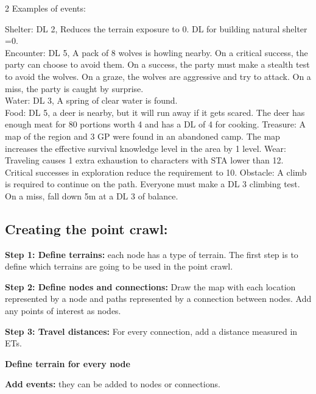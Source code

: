 \begin{multicols}{2}
Examples of events:

Shelter: DL 2, Reduces the terrain exposure to 0. DL for building natural shelter =0. \\
Encounter: DL 5, A pack of 8 wolves is howling nearby. On a critical success, the party can choose to avoid them. On a success, the party must make a stealth test to avoid the wolves. On a graze, the wolves are aggressive and try to attack. On a miss, the party is caught by surprise.\\
Water: DL 3, A spring of clear water is found. \\
Food: DL 5, a deer is nearby, but it will run away if it gets scared. The deer has enough meat for 80 portions worth 4 and has a DL of 4 for cooking.  
Treasure: A map of the region and 3 GP were found in an abandoned camp. The map increases the effective survival knowledge level in the area by 1 level.
Wear: Traveling causes 1 extra exhaustion to characters with STA lower than 12. Critical successes in exploration reduce the requirement to 10.
Obstacle: A climb is required to continue on the path. Everyone must make a DL 3 climbing test. On a miss, fall down 5m at a DL 3 of balance.

\subsection{Creating the point crawl:}

\textbf{Step 1: Define terrains:} each node has a type of terrain. The first step is to define which terrains are going to be used in the point crawl.

\textbf{Step 2: Define nodes and connections:} Draw the map with each location represented by a node and paths represented by a connection between nodes. Add any points of interest as nodes.

\textbf{Step 3: Travel distances:} For every connection, add a distance measured in ETs. 

\textbf{Define terrain for every node}

\textbf{Add events:} they can be added to nodes or connections. 


\end{multicols}



%




